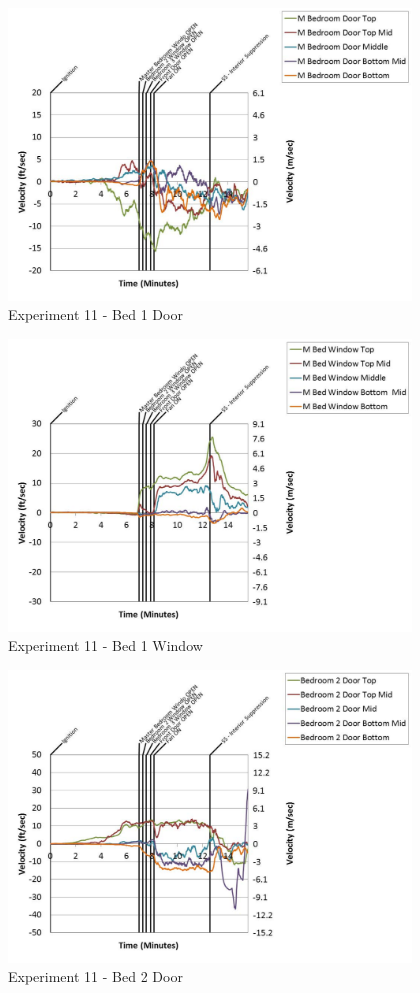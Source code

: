 \documentclass{article}
\begin{document}
\begin{appendices}
	\clearpage

	\begin{figure}[h!]
		\centering
		\includegraphics[height=3.05in]{0_Images/Results_Charts/Exp_11_Charts/Bed1Door.pdf}
		\caption{Experiment 11 - Bed 1 Door}
	\end{figure}
 

	\begin{figure}[h!]
		\centering
		\includegraphics[height=3.05in]{0_Images/Results_Charts/Exp_11_Charts/Bed1Window.pdf}
		\caption{Experiment 11 - Bed 1 Window}
	\end{figure}
 
	\clearpage

	\begin{figure}[h!]
		\centering
		\includegraphics[height=3.05in]{0_Images/Results_Charts/Exp_11_Charts/Bed2Door.pdf}
		\caption{Experiment 11 - Bed 2 Door}
	\end{figure}
 


\end{appendices}
\end{document}
